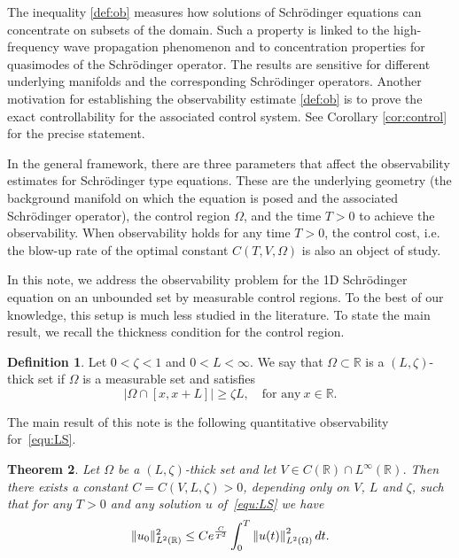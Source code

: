 \documentclass[a4paper,reqno]{amsart}
\newtheorem{theorem}{Theorem}[section]
\theoremstyle{definition}
\newtheorem{definition}[theorem]{Definition}
\numberwithin{equation}{section}
\newcommand{\R}{\mathbb{R}}
\def \R {{\mathbb{R} }}
\def \d {{\rm{d}}}
\begin{document}
\smallskip
The inequality \eqref{def:ob} measures how solutions of Schr\"odinger equations can concentrate on subsets of the domain. Such a property is linked to the high-frequency wave propagation phenomenon and to concentration properties for quasimodes of the Schr\"odinger operator. The results are sensitive for different underlying manifolds and the corresponding Schr\"odinger operators. Another motivation for establishing the observability estimate \eqref{def:ob} is to prove the exact controllability for the associated control system. See Corollary \ref{cor:control} for the precise statement.

\smallskip
In the general framework, there are three parameters that affect the observability estimates for Schr\"odinger type equations. These are the underlying geometry (the background manifold on which the equation is posed and the associated Schr\"odinger operator), the control region $\Omega$, and the time $T>0$ to achieve the observability. When observability holds for any time $T>0$, the control cost, i.e. the blow-up rate of the optimal constant $C(T,V,\Omega)$ is also an object of study. 

\smallskip
In this note, we address the observability problem for the 1D Schr\"odinger equation on an unbounded set by measurable control regions. To the best of our knowledge, this setup is much less studied in the literature. To state the main result, we recall the thickness condition for the control region.

\begin{definition}\label{def:thick}
   Let $0<\zeta<1$ and $0<L<\infty$. We say that $\Omega\subset \R$ is a $(L,\zeta)$-thick set if $\Omega$ is a  measurable set and satisfies   
   \begin{equation*}
       \left|\Omega\cap [x,x+L]\right|\ge \zeta L,\quad \mbox{for any} \  x\in \R.
  \end{equation*}
   \end{definition}

   The main result of this note is the following quantitative observability for~\eqref{equ:LS}.
   
  \begin{theorem}\label{thm:main1}
  Let $\Omega$ be a $(L,\zeta)$-thick set and let $V\in C(\R)\cap L^{\infty}(\R)$. Then there exists a constant $C=C(V,L,\zeta)>0$, depending only on $V$, $L$ and $\zeta$, such that for any $T>0$ and any solution $u$ of~\eqref{equ:LS} we have 
  \begin{equation}\label{est:Obser}
  \|u_{0}\|_{L^{2}(\R)}^{2}\le C e^{\frac{C}{T^{2}}}
   \int_{0}^{T}\left\|u(t)\right\|^{2}_{L^{2}(\Omega)}\d t.
  \end{equation}
  \end{theorem}
\end{document}
